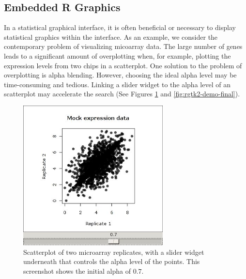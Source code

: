 \documentclass[article]{jss}
\begin{document}
\subsection{Embedded R Graphics}

In a statistical graphical interface, it is often beneficial or
necessary to display statistical graphics within the interface. As
an example, we consider the contemporary problem of visualizing
micoarray data. The large number of genes leads to a significant
amount of overplotting when, for example, plotting the expression
levels from two chips in a scatterplot. One solution to the problem of
overplotting is alpha blending. However, choosing the ideal alpha
level may be time-consuming and tedious. Linking a slider widget to
the alpha level of an  scatterplot may accelerate the
search (See Figures \ref{fig:rgtk2-demo-initial} and
\ref{fig:rgtk2-demo-final}).



\begin{figure}
\begin{center}
\includegraphics[width=3in]{demo-alpha-random-07-3}
\caption{\label{fig:rgtk2-demo-initial}Scatterplot of two microarray replicates,
with a slider widget underneath that controls the alpha level of the
points. This screenshot shows the initial alpha of $0.7$.}
\end{center}
\end{figure}
\end{document}
